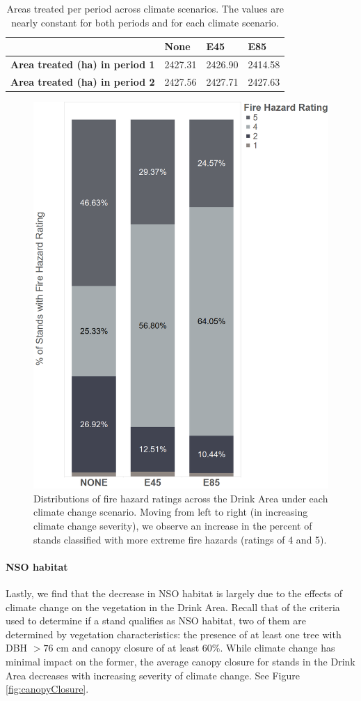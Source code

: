 \begin{table}[]
\centering
\caption[Area treated per period across climate scenarios]{Areas treated per period across climate scenarios. The values are nearly constant for both periods and for each climate scenario.}
\label{tab:treatedAreas}
\begin{tabular}{l|lll}
                                                                                                           & \textbf{None} & \textbf{E45} & \textbf{E85} \\ \hline
\textbf{Area treated (ha) in period 1} & 2427.31            & 2426.90 & 2414.58          \\
\textbf{Area treated (ha) in period 2}                     & 2427.56         & 2427.71        & 2427.63      
\end{tabular}
\end{table}

\begin{figure}[ht]
\centering
\includegraphics[width=.5\textwidth]{../images/FireHazardRatingsPerClimateScenario}
\caption[Distribution of fire hazard ratings over the Drink Area for each climate change scenario]{Distributions of fire hazard ratings across the Drink Area under each climate change scenario. Moving from left to right (in increasing climate change severity), we observe an increase in the percent of stands classified with more extreme fire hazards (ratings of 4 and 5).}
\label{fig:distOfFireHazards}
\end{figure}

\paragraph{NSO habitat}
Lastly, we find that the decrease in NSO habitat is largely due to the effects of climate change on the vegetation in the Drink Area. Recall that of the criteria used to determine if a stand qualifies as NSO habitat, two of them are determined by vegetation characteristics: the presence of at least one tree with DBH $> 76$ cm and canopy closure of at least 60\%. While climate change has minimal impact on the former, the average canopy closure for stands in the Drink Area decreases with increasing severity of climate change. See Figure \ref{fig:canopyClosure}.

